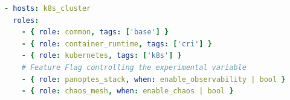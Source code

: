 \begin{lstlisting}[language=yaml, caption={Main Playbook Structure}, label={code:playbook}]
- hosts: k8s_cluster
  roles:
    - { role: common, tags: ['base'] }
    - { role: container_runtime, tags: ['cri'] }
    - { role: kubernetes, tags: ['k8s'] }
    # Feature Flag controlling the experimental variable
    - { role: panoptes_stack, when: enable_observability | bool }
    - { role: chaos_mesh, when: enable_chaos | bool }
\end{lstlisting}

